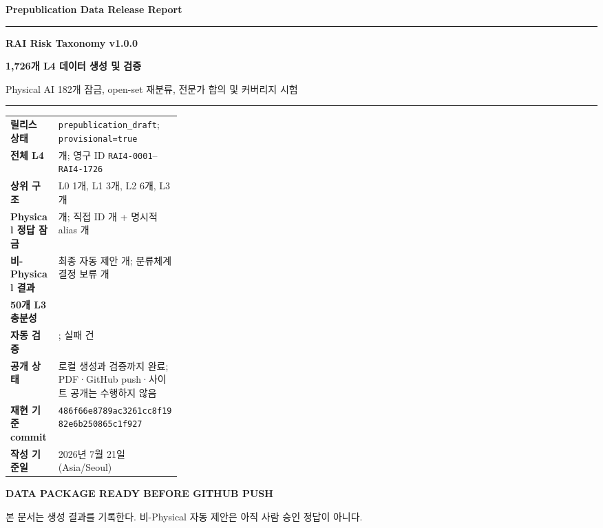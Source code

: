 \documentclass[11pt,a4paper]{article}
\newcommand{\code}[1]{\texttt{#1}}
\begin{document}
\begin{titlepage}
\thispagestyle{empty}
\vspace*{0.38in}
{\sffamily\bfseries\Large Prepublication Data Release Report\par}
\vspace{0.12in}
{\color{reportblue}\rule{\linewidth}{1.25pt}\par}
\vspace{0.28in}
{\sffamily\bfseries\Huge RAI Risk Taxonomy v1.0.0\par}
\vspace{0.10in}
{\sffamily\bfseries\Huge 1,726개 L4 데이터 생성 및 검증\par}
\vspace{0.20in}
{\sffamily\Large Physical AI 182개 잠금, open-set 재분류, 전문가 합의 및 커버리지 시험\par}
\vspace{0.28in}
{\color{reportblue}\rule{\linewidth}{0.65pt}\par}
\vspace{0.48in}

\begin{tabularx}{\linewidth}{>{\bfseries}L{0.29\linewidth}Y}
릴리스 상태 & \code{prepublication\_draft}; \code{provisional=true} \\
전체 L4 & \TotalLFour{}개; 영구 ID \code{RAI4-0001}--\code{RAI4-1726} \\
상위 구조 & L0 1개, L1 3개, L2 6개, L3 \TotalLThree{}개 \\
Physical 정답 잠금 & \PhysicalLocked{}개; 직접 ID \ExactMatches{}개 + 명시적 alias \ExplicitAliases{}개 \\
비-Physical 결과 & 최종 자동 제안 \FinalProposals{}개; 분류체계 결정 보류 \NeedsDecision{}개 \\
50개 L3 충분성 & \code{\CoverageConclusion} \\
자동 검증 & \code{\ValidationStatus}; 실패 \ValidationFailed{}건 \\
공개 상태 & 로컬 생성과 검증까지 완료; PDF·GitHub push·사이트 공개는 수행하지 않음 \\
재현 기준 commit & \code{486f66e8789ac3261cc8f1982e6b250865c1f927} \\
작성 기준일 & 2026년 7월 21일 (Asia/Seoul) \\
\end{tabularx}

\vfill
{\sffamily\bfseries\color{reportgreen}DATA PACKAGE READY BEFORE GITHUB PUSH\par}
{\sffamily 본 문서는 생성 결과를 기록한다. 비-Physical 자동 제안은 아직 사람 승인 정답이 아니다.\par}
\end{titlepage}
\end{document}
